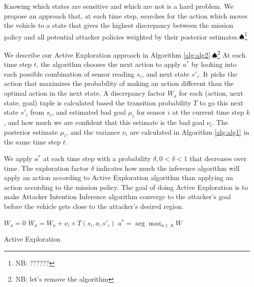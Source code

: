 \documentclass[letterpaper, 10 pt, conference]{ieeeconf}  %
\newcommand\NB[1]{$\spadesuit$\footnote{NB: #1}}
\begin{document}
Knowing which states are sensitive and which are not is a hard problem. We propose an approach that, at each time step, searches for the action which moves the vehicle to a state that gives the highest discrepancy between the mission policy and all potential attacker policies weighted by their posterior estimates.\NB{??????}

We describe our Active Exploration approach in Algorithm \ref{alg:alg2}.\NB{let's remove the algorithm} At each time step $t$, the algorithm chooses the next action to apply $a^*$ by looking into each possible combination of sensor reading $s_i$, and next state $s'_i$. It picks the action that maximizes the probability of making an action different than the optimal action in the next state. A discrepancy factor $W_a$ for each (action, next state, goal) tuple is calculated based the transition probability $T$ to go this next state $s'_i$ from $s_i$, and estimated bad goal $\mu_i$ for sensor $i$ at the current time step $k$, and how much we are confident that this estimate is the bad goal $\nu_i$. The posterior estimate $\mu_i$, and the variance $\nu_i$ are calculated in Algorithm \ref{alg:alg1} in the same time step $t$.

We apply $a^*$ at each time step with a probability $\delta, 0 < \delta < 1$ that decreases over time. The exploration factor $\delta$ indicates how much the inference algorithm will apply an action according to Active Exploration algorithm than applying an action according to the mission policy. The goal of doing Active Exploration is to make Attacker Intention Inference algorithm converge to the attacker's goal before the vehicle gets close to the attacker's desired region.
\begin{algorithm}\label{alg:alg2}
    {
        $W_a = 0$\;
        {
            {
                {                     $W_a= W_a +
                \nu_i\times T(s_i, a, s'_i)$\;
                }
            }
        }
    }
    $a^*=\arg\!\max_{a\in A}W$\;
    \caption{Active Exploration}
\end{algorithm}
\end{document}

